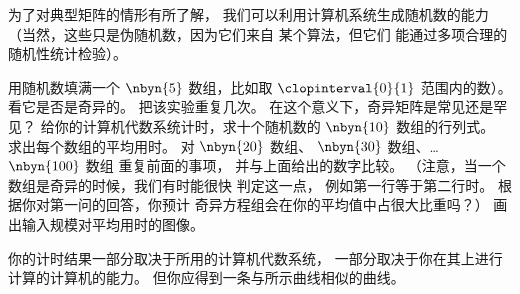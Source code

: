 \begin{exercises}
  \item
    为了对典型矩阵的情形有所了解，
    我们可以利用计算机系统生成随机数的能力
    （当然，这些只是伪随机数，因为它们来自
    某个算法，但它们
    能通过多项合理的随机性统计检验）。
    \begin{exparts}
      \partsitem 用随机数填满一个 $\nbyn{5}$ 数组，比如取
        $\clopinterval{0}{1}$ 范围内的数）。
        看它是否是奇异的。
        把该实验重复几次。
        在这个意义下，奇异矩阵是常见还是罕见？
      \partsitem 给你的计算机代数系统计时，求十个随机数的 $\nbyn{10}$ 数组的行列式。
        求出每个数组的平均用时。
        对 $\nbyn{20}$ 数组、
        $\nbyn{30}$ 数组、\ldots $\nbyn{100}$ 数组
        重复前面的事项，
        并与上面给出的数字比较。
        （注意，当一个数组是奇异的时候，我们有时能很快
        判定这一点，
        例如第一行等于第二行时。
        根据你对第一问的回答，你预计
        奇异方程组会在你的平均值中占很大比重吗？）
      \partsitem 画出输入规模对平均用时的图像。
    \end{exparts}
    \begin{answer}
      你的计时结果一部分取决于所用的计算机代数系统，
      一部分取决于你在其上进行计算的计算机的能力。
      但你应得到一条与所示曲线相似的曲线。


\end{answer}
\end{exercises}
